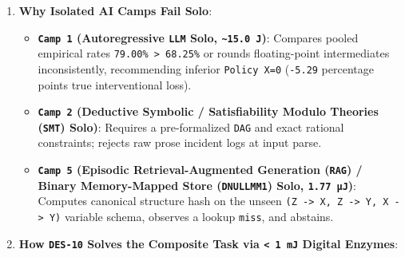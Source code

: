 \documentclass[10pt,letterpaper]{article}
\providecommand{\tightlist}{\setlength{\itemsep}{1pt}\setlength{\parskip}{0pt}}
\begin{document}
\begin{enumerate}
\def\labelenumi{\arabic{enumi}.}
\tightlist
\item
  \textbf{Why Isolated AI Camps Fail Solo}:

  \begin{itemize}
  \tightlist
  \item
    \textbf{\texttt{Camp\ 1} (Autoregressive \texttt{LLM} Solo,
    \texttt{\textasciitilde{}15.0\ J})}: Compares pooled empirical rates
    \texttt{79.00\%\ \textgreater{}\ 68.25\%} or rounds floating-point
    intermediates inconsistently, recommending inferior
    \texttt{Policy\ X=0} (\texttt{-5.29} percentage points true
    interventional loss).
  \item
    \textbf{\texttt{Camp\ 2} (Deductive Symbolic / Satisfiability Modulo
    Theories (\texttt{SMT}) Solo)}: Requires a pre-formalized
    \texttt{DAG} and exact rational constraints; rejects raw prose
    incident logs at input parse.
  \item
    \textbf{\texttt{Camp\ 5} (Episodic Retrieval-Augmented Generation
    (\texttt{RAG}) / Binary Memory-Mapped Store (\texttt{DNULLMM1})
    Solo, \texttt{1.77\ µJ})}: Computes canonical structure hash on the
    unseen
    \texttt{(Z\ -\textgreater{}\ X,\ Z\ -\textgreater{}\ Y,\ X\ -\textgreater{}\ Y)}
    variable schema, observes a lookup \texttt{miss}, and abstains.
  \end{itemize}
\item
  \textbf{How \texttt{DES-10} Solves the Composite Task via
  \texttt{\textless{}\ 1\ mJ} Digital Enzymes}:


\end{enumerate}
\end{document}
